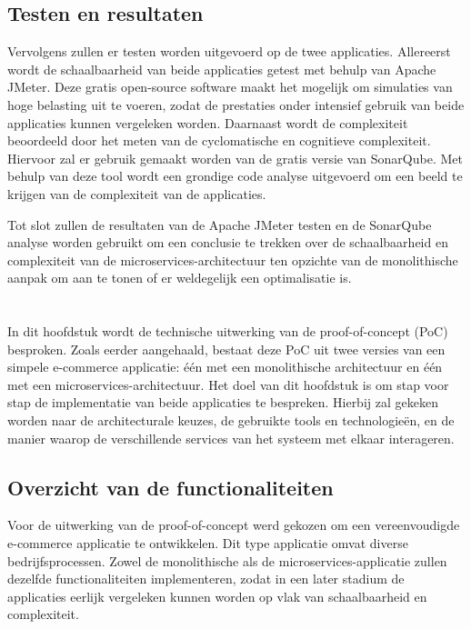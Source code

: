 \section{Testen en resultaten}

Vervolgens zullen er testen worden uitgevoerd op de twee applicaties. Allereerst wordt de schaalbaarheid van beide applicaties getest met behulp van Apache JMeter. Deze gratis open-source software maakt het mogelijk om simulaties van hoge belasting uit te voeren, zodat de prestaties onder intensief gebruik van beide applicaties kunnen vergeleken worden. Daarnaast wordt de complexiteit beoordeeld door het meten van de cyclomatische en cognitieve complexiteit. Hiervoor zal er gebruik gemaakt worden van de gratis versie van SonarQube. Met behulp van deze tool wordt een grondige code analyse uitgevoerd om een beeld te krijgen van de complexiteit van de applicaties.

Tot slot zullen de resultaten van de Apache JMeter testen en de SonarQube analyse worden gebruikt om een conclusie te trekken over de schaalbaarheid en complexiteit van de microservices-architectuur ten opzichte van de monolithische aanpak om aan te tonen of er weldegelijk een optimalisatie is.




\chapter{}%
\label{ch:uitwerking}

In dit hoofdstuk wordt de technische uitwerking van de proof-of-concept (PoC) besproken. Zoals eerder aangehaald, bestaat deze PoC uit twee versies van een simpele e-commerce applicatie: één met een monolithische architectuur en één met een microservices-architectuur. Het doel van dit hoofdstuk is om stap voor stap de implementatie van beide applicaties te bespreken. Hierbij zal gekeken worden naar de architecturale keuzes, de gebruikte tools en technologieën, en de manier waarop de verschillende services van het systeem met elkaar interageren.

\section{Overzicht van de functionaliteiten}

Voor de uitwerking van de proof-of-concept werd gekozen om een vereenvoudigde e-commerce applicatie te ontwikkelen. Dit type applicatie omvat diverse bedrijfsprocessen. Zowel de monolithische als de microservices-applicatie zullen dezelfde functionaliteiten implementeren, zodat in een later stadium de applicaties eerlijk vergeleken kunnen worden op vlak van schaalbaarheid en complexiteit.

